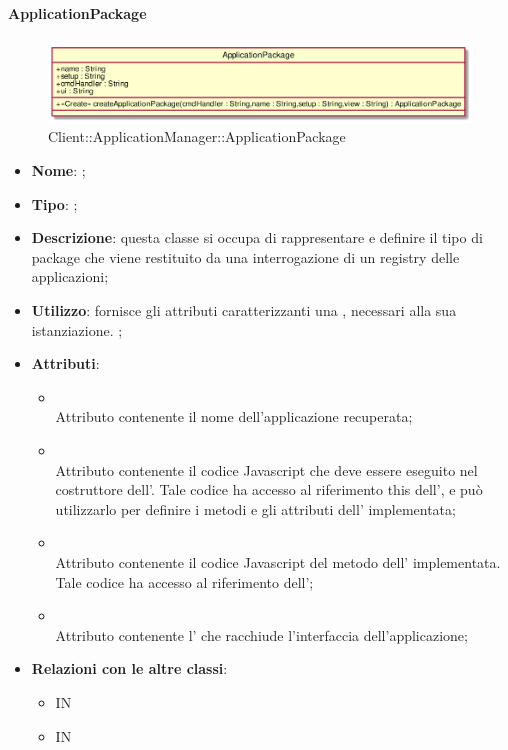 \hypertarget{ApplicationPackage_label}{\paragraph{ApplicationPackage}}
\begin{figure}[h]
	\centering
	\includegraphics[width=\textwidth,height=\textheight,keepaspectratio]{images/ClassApplicationPackage.png}
	\caption{Client::ApplicationManager::ApplicationPackage}
\end{figure}
\begin{itemize}
	\item \textbf{Nome}: ;
	\item \textbf{Tipo}: ;
	\item \textbf{Descrizione}: questa classe si occupa di rappresentare e definire il tipo di package che viene restituito da una interrogazione di un registry delle applicazioni;
	\item \textbf{Utilizzo}: fornisce gli attributi caratterizzanti una , necessari alla sua istanziazione. ;
	\item \textbf{Attributi}:
	\begin{itemize}
		\item[]  \\
		Attributo contenente il nome dell'applicazione recuperata;
		\item[]  \\
		Attributo contenente il codice Javascript che deve essere eseguito nel costruttore dell'. Tale codice ha accesso al riferimento this dell', e può utilizzarlo per definire i metodi e gli attributi dell' implementata;
		\item[]  \\
		Attributo contenente il codice Javascript del metodo  dell' implementata. Tale codice ha accesso al riferimento  dell';
		\item[]  \\
		Attributo contenente l' che racchiude l'interfaccia dell'applicazione;
	\end{itemize}
	\item \textbf{Relazioni con le altre classi}:
	\begin{itemize}
		\item IN \hyperlink{Application_label}{}
		\item IN \hyperlink{<<interface>> ApplicationRegistryClient_label}{}
	\end{itemize}
\end{itemize}
\FloatBarrier

